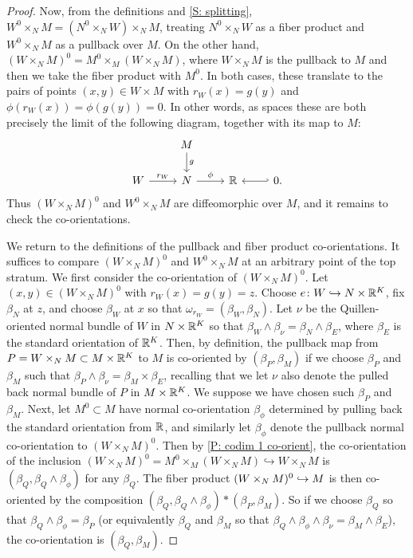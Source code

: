\begin{proof}
	Now, from the definitions and \cref{S: splitting}, $W^0 \times_N M = (N^0 \times_N W) \times_N M$, treating $N^0 \times_N W$ as a fiber product and $W^0 \times_N M$ as a pullback over $M$.
	On the other hand, $(W \times_N M)^0 = M^0 \times_M (W \times_N M)$, where $W \times_N M$ is the pullback to $M$ and then we take the fiber product with $M^0$.
	In both cases, these translate to the pairs of points $(x,y) \in W \times M$ with $r_W(x) = g(y)$ and $\phi(r_W(x)) = \phi(g(y)) = 0$.
	In other words, as spaces these are both precisely the limit of the following diagram, together with its map to $M$:
	\[
	\begin{tikzcd}
		& M \arrow[d,"g"] & \\
		W \arrow[r, "r_W"] & N \arrow[r, "\phi"] & \R & \arrow[l,hook'] 0.
	\end{tikzcd}
	\]
	Thus $(W \times_N M)^0$ and $W^0 \times_N M$ are diffeomorphic over $M$, and it remains to check the co-orientations.

	We return to the definitions of the pullback and fiber product co-orientations.
	It suffices to compare $(W \times_N M)^0$ and $W^0 \times_N M$ at an arbitrary point of the top stratum.
	We first consider the co-orientation of $(W \times_N M)^0$.
	Let $(x,y) \in (W \times_N M)^0$ with $r_W(x) = g(y) = z$.
	Choose $e \colon W \hookrightarrow N \times \mathbb{R}^K$, fix $\beta_N$ at $z$, and choose $\beta_W$ at $x$ so that $\omega_{r_W} = (\beta_W,\beta_N)$.
	Let $\nu$ be the Quillen-oriented normal bundle of $W$ in $N \times \mathbb{R}^K$ so that $\beta_W \wedge \beta_\nu = \beta_N \wedge \beta_E$, where $\beta_E$ is the standard orientation of $\mathbb{R}^K$.
	Then, by definition, the pullback map from $P = W \times_N M \subset M \times \mathbb{R}^K$ to $M$ is co-oriented by $(\beta_P,\beta_M)$ if we choose $\beta_P$ and $\beta_M$ such that $\beta_P \wedge \beta_\nu = \beta_M \times \beta_E$, recalling that we let $\nu$ also denote the pulled back normal bundle of $P$ in $M \times \mathbb{R}^K$.
	We suppose we have chosen such $\beta_P$ and $\beta_M$.
	Next, let $M^0 \subset M$ have normal co-orientation $\beta_\phi$ determined by pulling back the standard orientation from $\mathbb{R}$, and similarly let $\beta_\phi$ denote the pullback normal co-orientation to $(W \times_N M)^0$.
	Then by \cref{P: codim 1 co-orient}, the co-orientation of the inclusion $(W \times_N M)^0 = M^0 \times_M (W \times_N M) \hookrightarrow W \times_N M$ is $(\beta_Q,\beta_Q \wedge \beta_\phi)$ for any $\beta_Q$.
	The fiber product $(W \times_N M)^0 \hookrightarrow M$ is then co-oriented by the composition $(\beta_Q,\beta_Q \wedge \beta_\phi)*(\beta_P,\beta_M)$.
	So if we choose $\beta_Q$ so that $\beta_Q \wedge \beta_\phi = \beta_P$ (or equivalently $\beta_Q$ and $\beta_M$ so that $\beta_Q \wedge \beta_\phi \wedge \beta_\nu = \beta_M \wedge \beta_E$), the co-orientation is $(\beta_Q,\beta_M)$.


\end{proof}
